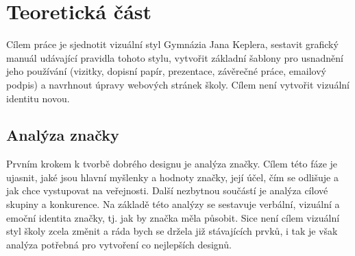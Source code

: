 \documentclass[11pt,a4paper,twoside,openright]{report}
\begin{document}


\setcounter{tocdepth}{2}
\tableofcontents

\chapter{Teoretická část}
\pagestyle{fancy}




Cílem práce je sjednotit vizuální styl Gymnázia Jana Keplera, sestavit grafický manuál udávající pravidla tohoto stylu, vytvořit základní šablony pro usnadnění jeho používání (vizitky, dopisní papír, prezentace, závěrečné práce, emailový podpis) a navrhnout úpravy webových stránek školy.
Cílem není vytvořit vizuální identitu novou.



\section{Analýza značky}
Prvním krokem k tvorbě dobrého designu je analýza značky. Cílem této fáze je ujasnit, jaké jsou hlavní myšlenky a hodnoty značky, její účel, čím se odlišuje a jak chce vystupovat na veřejnosti. Další nezbytnou součástí je analýza cílové skupiny a konkurence. Na základě této analýzy se sestavuje verbální, vizuální a emoční identita značky, tj. jak by značka měla působit. Sice není cílem vizuální styl školy zcela změnit a ráda bych se držela již stávajících prvků, i tak je však analýza potřebná pro vytvoření co nejlepších designů.
\end{document}
